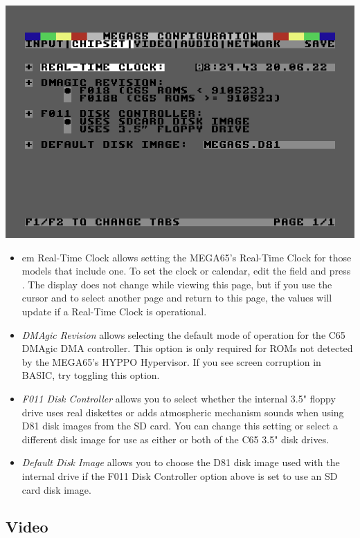 \includegraphics[width=\linewidth]{images/ss-m65config-2.png}

\begin{itemize}
  \item{em Real-Time Clock} allows setting the MEGA65's Real-Time Clock for those models that include one. To set the clock or calendar, edit the field and press . The display does not change while viewing this page, but if you use the cursor  and  to select another page and return to this page, the values will update if a Real-Time Clock is operational.
  \item{\em DMAgic Revision} allows selecting the default mode of operation for the C65 DMAgic DMA controller. This option is only required for ROMs not detected by the MEGA65's HYPPO Hypervisor. If you see screen corruption in BASIC, try toggling this option.
  \item{\em F011 Disk Controller} allows you to select whether the internal 3.5" floppy drive uses real diskettes or adds atmospheric mechanism sounds when using D81 disk images from the SD card. You can change this setting or select a different disk image for use as either or both of the C65 3.5" disk drives.
  \item{\em Default Disk Image} allows you to choose the D81 disk image used with the internal drive if the F011 Disk Controller option above is set to use an SD card disk image.
\end{itemize}

\subsection{Video}

